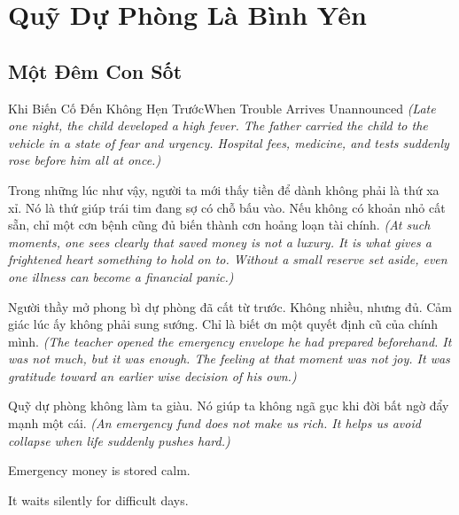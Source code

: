 \chapter{Quỹ Dự Phòng Là Bình Yên}

\section{Một Đêm Con Sốt}
\begin{truyen}{Khi Biến Cố Đến Không Hẹn Trước}{When Trouble Arrives Unannounced}
\textit{(Late one night, the child developed a high fever. The father carried the child to the vehicle in a state of fear and urgency. Hospital fees, medicine, and tests suddenly rose before him all at once.)}

Trong những lúc như vậy, người ta mới thấy tiền để dành không phải là thứ xa xỉ. Nó là thứ giúp trái tim đang sợ có chỗ bấu vào. Nếu không có khoản nhỏ cất sẵn, chỉ một cơn bệnh cũng đủ biến thành cơn hoảng loạn tài chính.
\textit{(At such moments, one sees clearly that saved money is not a luxury. It is what gives a frightened heart something to hold on to. Without a small reserve set aside, even one illness can become a financial panic.)}

Người thầy mở phong bì dự phòng đã cất từ trước. Không nhiều, nhưng đủ. Cảm giác lúc ấy không phải sung sướng. Chỉ là biết ơn một quyết định cũ của chính mình.
\textit{(The teacher opened the emergency envelope he had prepared beforehand. It was not much, but it was enough. The feeling at that moment was not joy. It was gratitude toward an earlier wise decision of his own.)}
\end{truyen}

\begin{baihoc}
Quỹ dự phòng không làm ta giàu. Nó giúp ta không ngã gục khi đời bất ngờ đẩy mạnh một cái.
\textit{(An emergency fund does not make us rich. It helps us avoid collapse when life suddenly pushes hard.)}
\end{baihoc}

\begin{ghinhoanh}
Emergency money is stored calm.

It waits silently for difficult days.
\end{ghinhoanh}


